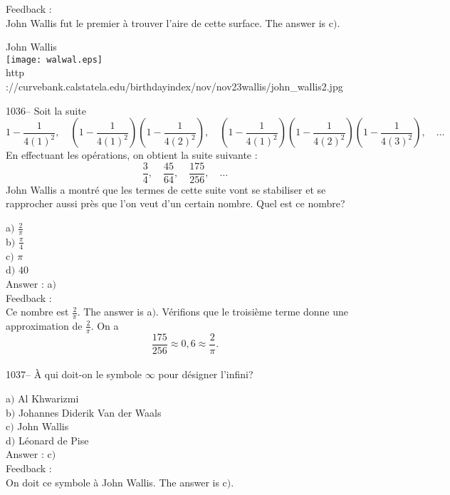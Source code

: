 ﻿\documentclass[letterpaper, 12pt]{article}
\begin{document}
Feedback :\\
John Wallis fut le premier \`a trouver l'aire de cette surface.
The answer is c$)$.\\

        \begin{center}
        John Wallis\\
    \texttt{[image: walwal.eps]}\\
        {\footnotesize http
://curvebank.calstatela.edu/birthdayindex/nov/nov23wallis/john\_wallis2.jpg}
    \end{center}

1036-- Soit la suite
$$\displaystyle{1-\frac1{4(1)^2},\quad\left(1-\frac1{4(1)^2}\right)\left(1-\frac1{4(2)^2}\right),\quad
\left(1-\frac1{4(1)^2}\right)\left(1-\frac1{4(2)^2}\right)\left(1-\frac1{4(3)^2}\right),\quad\ldots}$$
En effectuant les op\'erations, on obtient la suite suivante :
$$\displaystyle{\frac34,\quad\frac{45}{64},\quad\frac{175}{256},\quad\ldots}$$
John Wallis a montr\'e que les termes de cette suite vont se
stabiliser et se rapprocher aussi pr\`es que l'on veut d'un certain
nombre. Quel est ce nombre?

a$)$ $\frac2{\pi}$ \\[2mm]
b$)$ $\frac{\pi}4$  \\[2mm]
c$)$ $\pi$  \\[2mm]
d$)$ $40$\\

Answer : a$)$\\

Feedback :\\
Ce nombre est $\frac2{\pi}$. The answer is a$)$. V\'erifions que
le troisi\`eme terme donne une approximation de $\frac2{\pi}$. On a
$$\displaystyle{\frac{175}{256}\approx0,6\approx\frac2{\pi}}.$$
\\

1037-- \`A qui doit-on le symbole $\infty$ pour d\'esigner l'infini?

a$)$ Al Khwarizmi \\
b$)$ Johannes Diderik Van der Waals   \\
c$)$ John Wallis  \\
d$)$ L\'eonard de Pise \\

Answer : c$)$\\

Feedback :\\
On doit ce symbole \`a John Wallis.
The answer is c$)$.\\
\end{document}
